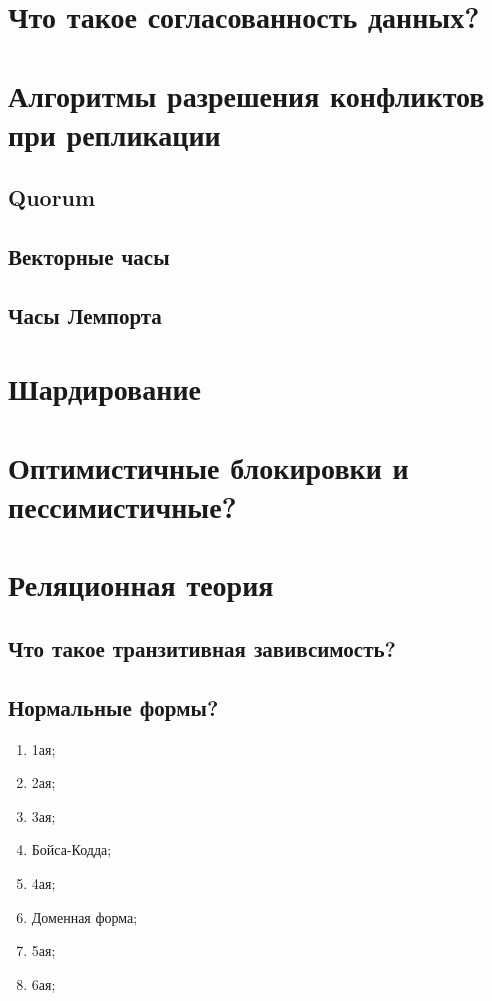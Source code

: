 \section{Что такое согласованность данных?}

\section{Алгоритмы разрешения конфликтов при репликации}
\subsection{Quorum}
\subsection{Векторные часы}
\subsection{Часы Лемпорта}

\section{Шардирование}
\section{Оптимистичные блокировки и пессимистичные?}

\section{Реляционная теория}
\subsection{Что такое транзитивная завивсимость?}
\subsection{Нормальные формы?}
\begin{enumerate}
    \item 1ая;
    \item 2ая;
    \item 3ая;
    \item Бойса-Кодда;
    \item 4ая;
    \item Доменная форма;
    \item 5ая;
    \item 6ая;
\end{enumerate}
